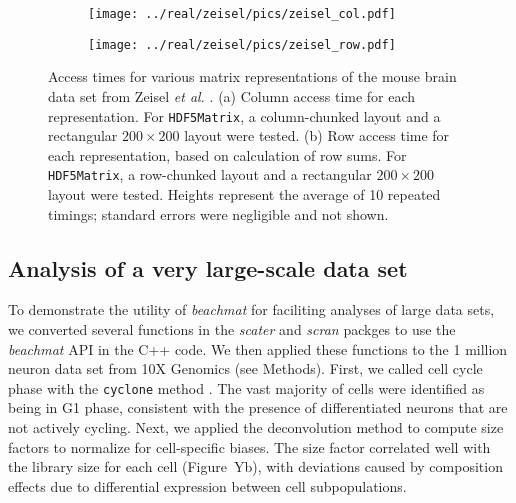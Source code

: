 \documentclass[10pt,letterpaper]{article}
\newcommand{\beachmat}{\textit{beachmat}}
\newcommand{\code}[1]{\texttt{#1}}
\begin{document}
\begin{figure}[bt]
    \begin{subfigure}[b]{0.49\textwidth}
        \texttt{[image: ../real/zeisel/pics/zeisel\_col.pdf]}
        \caption{}
    \end{subfigure}
    \begin{subfigure}[b]{0.49\textwidth}
        \texttt{[image: ../real/zeisel/pics/zeisel\_row.pdf]}
        \caption{}
    \end{subfigure}
    \caption{Access times for various matrix representations of the mouse brain data set from Zeisel \textit{et al.} \cite{zeisel2015brain}.
        (a) Column access time for each representation.
        For \code{HDF5Matrix}, a column-chunked layout and a rectangular $200 \times 200$ layout were tested.
        (b) Row access time for each representation, based on calculation of row sums.
        For \code{HDF5Matrix}, a row-chunked layout and a rectangular $200 \times 200$ layout were tested.
        Heights represent the average of 10 repeated timings; standard errors were negligible and not shown.
    }
    \label{fig:zeisel}
\end{figure}

\subsection*{Analysis of a very large-scale data set}
To demonstrate the utility of \beachmat{} for faciliting analyses of large data sets, we converted several functions in the \textit{scater} \cite{mccarthy2017scater} and \textit{scran} packges \cite{lun2016stepbystep} to use the \beachmat{} API in the C++ code.
We then applied these functions to the 1 million neuron data set from 10X Genomics (see Methods).
First, we called cell cycle phase with the \code{cyclone} method \cite{scialdone2015computational}. 
The vast majority of cells were identified as being in G1 phase, consistent with the presence of differentiated neurons that are not actively cycling.
Next, we applied the deconvolution method \cite{lun2016pooling} to compute size factors to normalize for cell-specific biases.
The size factor correlated well with the library size for each cell (Figure~Yb), with deviations caused by composition effects \cite{robinson2010scaling} due to differential expression between cell subpopulations.
\end{document}
